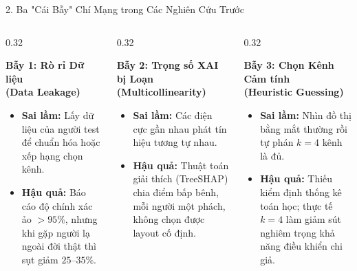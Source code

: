 \documentclass[aspectratio=169,10pt]{beamer}
\begin{document}
\begin{frame}{2. Ba "Cái Bẫy" Chí Mạng trong Các Nghiên Cứu Trước}
    \begin{columns}[T]
        \begin{column}{0.32\textwidth}
            \begin{alertblock}{\textbf{Bẫy 1: Rò rỉ Dữ liệu\\(Data Leakage)}}
                \scriptsize
                \begin{itemize}
                    \item \textbf{Sai lầm:} Lấy dữ liệu của người test để chuẩn hóa hoặc xếp hạng chọn kênh.
                    \item \textbf{Hậu quả:} Báo cáo độ chính xác ảo $>95\%$, nhưng khi gặp người lạ ngoài đời thật thì sụt giảm $25\text{--}35\%$.
                \end{itemize}
            \end{alertblock}
        \end{column}
        
        \begin{column}{0.32\textwidth}
            \begin{alertblock}{\textbf{Bẫy 2: Trọng số XAI bị Loạn\\(Multicollinearity)}}
                \scriptsize
                \begin{itemize}
                    \item \textbf{Sai lầm:} Các điện cực gần nhau phát tín hiệu tương tự nhau.
                    \item \textbf{Hậu quả:} Thuật toán giải thích (TreeSHAP) chia điểm bấp bênh, mỗi người một phách, không chọn được layout cố định.
                \end{itemize}
            \end{alertblock}
        \end{column}
        
        \begin{column}{0.32\textwidth}
            \begin{alertblock}{\textbf{Bẫy 3: Chọn Kênh Cảm tính\\(Heuristic Guessing)}}
                \scriptsize
                \begin{itemize}
                    \item \textbf{Sai lầm:} Nhìn đồ thị bằng mắt thường rồi tự phán $k=4$ kênh là đủ.
                    \item \textbf{Hậu quả:} Thiếu kiểm định thống kê toán học; thực tế $k=4$ làm giảm sút nghiêm trọng khả năng điều khiển chi giả.
                \end{itemize}
            \end{alertblock}
        \end{column}
    \end{columns}
\end{frame}
\end{document}
